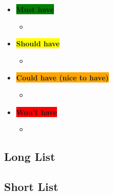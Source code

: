 \begin{itemize}
    \item \textbf{\colorbox{green}{Must have}}
    \begin{itemize}
        \item 
    \end{itemize}
    \item \textbf{\colorbox{yellow}{Should have}}
    \begin{itemize}
        \item 
    \end{itemize}
    \item \textbf{\colorbox{orange}{Could have (nice to have)}}
    \begin{itemize}
        \item 
    \end{itemize}
    \item \textbf{\colorbox{red}{Won't have}}
    \begin{itemize}
        \item 
    \end{itemize}
\end{itemize}

\subsection{Long List}


\subsection{Short List}


